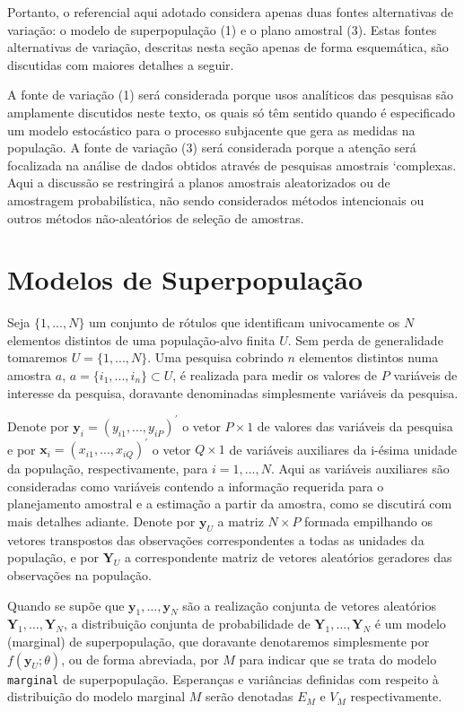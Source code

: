 \documentclass[]{book}
\theoremstyle{definition}
\theoremstyle{definition}
\theoremstyle{definition}
\theoremstyle{remark}
\begin{document}
Portanto, o referencial aqui adotado considera apenas duas fontes
alternativas de variação: o modelo de superpopulação (1) e o plano
amostral (3). Estas fontes alternativas de variação, descritas nesta
seção apenas de forma esquemática, são discutidas com maiores detalhes a
seguir.

A fonte de variação (1) será considerada porque usos analíticos das
pesquisas são amplamente discutidos neste texto, os quais só têm sentido
quando é especificado um modelo estocástico para o processo subjacente
que gera as medidas na população. A fonte de variação (3) será
considerada porque a atenção será focalizada na análise de dados obtidos
através de pesquisas amostrais `complexas. Aqui a discussão se
restringirá a planos amostrais aleatorizados ou de amostragem
probabilística, não sendo considerados métodos intencionais ou outros
métodos não-aleatórios de seleção de amostras.

\section{Modelos de Superpopulação}\label{modelos-de-superpopulacao}

Seja \(\{1,...,N\}\) um conjunto de rótulos que identificam univocamente
os \(N\) elementos distintos de uma população-alvo finita \(U\). Sem
perda de generalidade tomaremos \(U=\{1,...,N\}\). Uma pesquisa cobrindo
\(n\) elementos distintos numa amostra \(a\),
\(a=\{i_{1},...,i_{n}\}\subset U\), é realizada para medir os valores de
\(P\) variáveis de interesse da pesquisa, doravante denominadas
simplesmente variáveis da pesquisa.

Denote por \(\mathbf{y}_i=(y_{i1},...,y_{iP})^{\prime }\) o vetor
\(P\times 1\) de valores das variáveis da pesquisa e por
\(\mathbf{x}_{i}=(x_{i1},...,x_{iQ})^{\prime }\) o vetor \(Q\times 1\)
de variáveis auxiliares da i-ésima unidade da população,
respectivamente, para \(i=1,...,N\). Aqui as variáveis auxiliares são
consideradas como variáveis contendo a informação requerida para o
planejamento amostral e a estimação a partir da amostra, como se
discutirá com mais detalhes adiante. Denote por \(\mathbf{y}_{U}\) a
matriz \(N \times P\) formada empilhando os vetores transpostos das
observações correspondentes a todas as unidades da população, e por
\(\mathbf{Y}_{U}\) a correspondente matriz de vetores aleatórios
geradores das observações na população.

Quando se supõe que \(\mathbf{y}_1 ,\ldots, \mathbf{y}_N\) são a
realização conjunta de vetores aleatórios
\(\mathbf{Y}_1 ,\ldots, \mathbf{Y}_N\), a distribuição conjunta de
probabilidade de \(\mathbf{Y}_1 ,\ldots, \mathbf{Y}_N\) é um modelo
(marginal) de superpopulação, que doravante denotaremos simplesmente por
\(f(\mathbf{y}_U;\theta)\), ou de forma abreviada, por \(M\) para
indicar que se trata do modelo \texttt{marginal} de superpopulação.
Esperanças e variâncias definidas com respeito à distribuição do modelo
marginal \(M\) serão denotadas \(E_M\) e \(V_M\) respectivamente.
\end{document}
